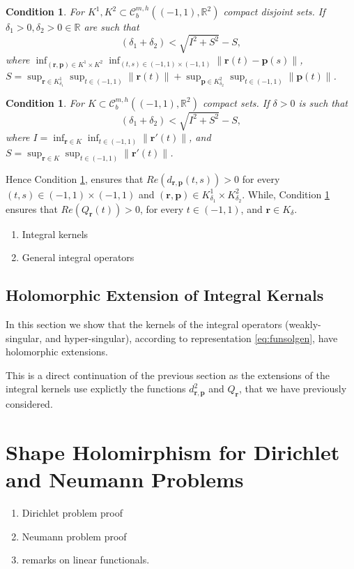 \documentclass{article}
\newtheorem{condition}[theorem]{Condition}
\newcommand{\IR}{{\mathbb R}}
\newcommand{\bp}{{\bm p}}
\newcommand{\rgeoh}[2]{\mathcal{C}_b^{#1,#2}\left( (-1,1), \IR^2 \right)}
\newcommand{\br}{\bm{r}}
\newcommand{\iinterv}{(-1,1)\times(-1,1)}
\begin{document}
\begin{condition}
\label{condition:dcross}
For $K^1,K^2 \subset \rgeoh{m}{h}$ compact disjoint sets. If $\delta_1>0,\delta_2>0 \in \IR$ are such that 
$$
(\delta_1 + \delta_2) < \sqrt{I^2+S^2}-S,
$$
where $\inf_{(\br,\bp) \in K^1 \times K^2} \inf_{(t,s) \in (-1,1)\times(-1,1)}
 \| \br(t) - \bp(s) \|$, $S = \sup_{\br \in K^1_{\delta_1}} \sup_{t \in (-1,1)} \| \br(t)\| +
\sup_{\bp \in K^2_{\delta_2}} \sup_{t \in (-1,1)} \| \bp(t)\|$. 
\end{condition}

\begin{condition}
\label{condition:Qself}
For $K \subset \rgeoh{m}{h}$ compact  sets. If $\delta>0 $ is such that 
$$
(\delta_1 + \delta_2) < \sqrt{I^2+S^2}-S,
$$
where $I = \inf_{\br \in K} \inf_{t \in (-1,1)} \| \br'(t)\|$, and $S = \sup_{\br \in K} \sup_{t \in (-1,1)} \|\br'(t)\|$.
\end{condition}
Hence Condition \ref{condition:dcross}, ensures that $Re(d_{\br,\bp}(t,s))>0$ for every $(t,s) \in \iinterv$ and $(\br,\bp) \in K^1_{\delta_1} \times K^2_{\delta_2}$. While, Condition \ref{condition:Qself} ensures that $Re(Q_{\br}(t)) >0$, for every $t \in (-1,1)$, and $\br \in K_\delta$. 
\begin{enumerate}
\item 
Integral kernels 
\item 
General integral operators
\end{enumerate}
\subsection{Holomorphic Extension of Integral Kernals}
In this section we show that the kernels of the integral operators (weakly-singular, and hyper-singular), according to representation \eqref{eq:funsolgen}, have holomorphic extensions. 

This is a direct continuation of the previous section as the extensions of the integral kernels use explictly the functions $d_{\br,\bp}^2$ and $Q_{\br}$, that we have previously considered.

\section{Shape Holomirphism for Dirichlet and Neumann Problems}
\begin{enumerate}
\item 
Dirichlet problem proof
\item 
Neumann problem proof 
\item 
remarks on linear functionals.
\end{enumerate}
\end{document}
